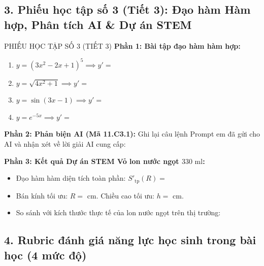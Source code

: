 \documentclass[12pt, a4paper]{article}
\begin{document}
\subsection*{3. Phiếu học tập số 3 (Tiết 3): Đạo hàm Hàm hợp, Phân tích AI & Dự án STEM}

\begin{pedabox}{PHIẾU HỌC TẬP SỐ 3 (TIẾT 3)}
\textbf{Phần 1: Bài tập đạo hàm hàm hợp:}
\begin{enumerate}[leftmargin=0.6cm]
    \item $y = (3x^2 - 2x + 1)^5 \implies y' = $ \dotfill
    \item $y = \sqrt{4x^2 + 1} \implies y' = $ \dotfill
    \item $y = \sin(3x - 1) \implies y' = $ \dotfill
    \item $y = e^{-5x} \implies y' = $ \dotfill
\end{enumerate}

\textbf{Phần 2: Phản biện AI (Mã 11.C3.1):}
Ghi lại câu lệnh Prompt em đã gửi cho AI và nhận xét về lời giải AI cung cấp: \dotfill
\dotfill

\textbf{Phần 3: Kết quả Dự án STEM Vỏ lon nước ngọt $330\text{ ml}$:}
\begin{itemize}
    \item Đạo hàm hàm diện tích toàn phần: $S'_{\text{tp}}(R) = $ \dotfill
    \item Bán kính tối ưu: $R = $ \dotfill cm. Chiều cao tối ưu: $h = $ \dotfill cm.
    \item So sánh với kích thước thực tế của lon nước ngọt trên thị trường: \dotfill
\end{itemize}
\end{pedabox}

\subsection*{4. Rubric đánh giá năng lực học sinh trong bài học (4 mức độ)}
\end{document}
